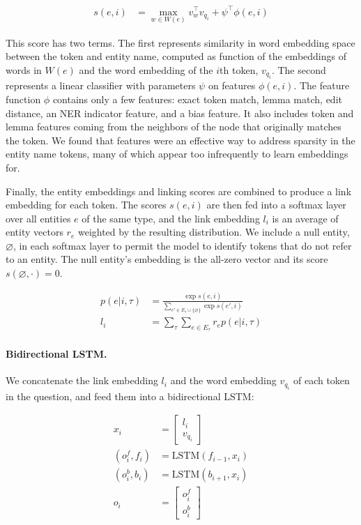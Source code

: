 \begin{align}
s(e,i) & = \max_{w \in W(e)} v_w^\intercal v_{q_i} + \psi^\intercal \phi(e,i)
\end{align}

This score has two terms. The first represents similarity in word embedding 
space between the token and entity name, computed as function of the embeddings 
of words in $W(e)$ and the word embedding of the $i$th token, $v_{q_i}$. The 
second represents a linear classifier with parameters $\psi$ on features 
$\phi(e,i)$.
The feature function $\phi$ contains only a few features: exact token match, 
lemma match, edit distance, an NER indicator feature, and a bias feature.
It also includes token and lemma features coming from the neighbors of the node
that originally matches the token. We found that features were an effective way
to address sparsity in the entity name tokens, many of which appear too 
infrequently
to learn embeddings for.

Finally, the entity embeddings and linking scores are combined to produce a 
link embedding for each token.
The scores $s(e,i)$ are then fed into a softmax layer over all entities $e$ of 
the same type, and the link embedding $l_{i}$ is an average of entity vectors 
$r_e$ weighted by the resulting distribution.
We include a null entity, $\varnothing$, in each softmax layer to permit the 
model to identify tokens that do not refer to an entity. The null entity's 
embedding is the all-zero vector and its score $s(\varnothing, \cdot) = 0$.

\begin{align}
p(e | i, \tau) & = \frac{\exp{s(e,i)}}{\sum_{e'\in E_\tau \cup \{\varnothing\}} 
\exp{s(e',i)}} \\
l_{i} & = \sum_\tau \sum_{e \in E_\tau} r_e p(e | i, \tau)
\end{align}

\paragraph{Bidirectional LSTM.}
We concatenate the link embedding $l_i$ and the word embedding $v_{q_i}$ of 
each token in the question, and feed them into a bidirectional LSTM:

\begin{align}
x_i &= \begin{bmatrix} l_{i} \\ v_{q_i} \end{bmatrix} \\
(o^f_i, f_i) &= \text{LSTM}(f_{i-1}, x_i) \\
(o^b_i, b_i) &= \text{LSTM}(b_{i+1}, x_i) \\
o_i &= \begin{bmatrix} o^f_i \\  o^b_i \end{bmatrix}
\end{align}

